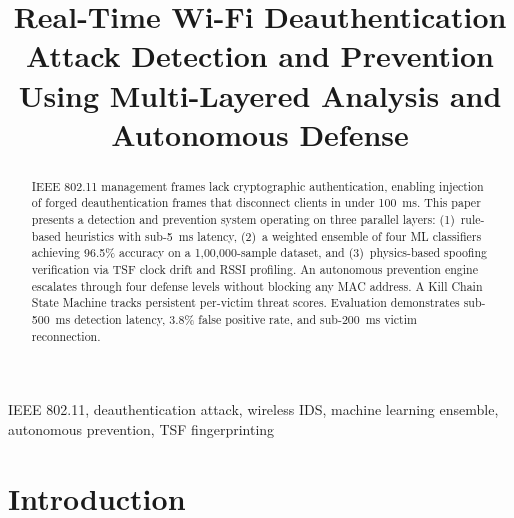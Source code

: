 \documentclass[conference]{IEEEtran}
\begin{document}
\title{Real-Time Wi-Fi Deauthentication Attack Detection and Prevention Using Multi-Layered Analysis and Autonomous Defense}

\author{
    \and
}

\maketitle

\begin{abstract}
IEEE 802.11 management frames lack cryptographic authentication, enabling injection of forged deauthentication frames that disconnect clients in under 100~ms. This paper presents a detection and prevention system operating on three parallel layers: (1)~rule-based heuristics with sub-5~ms latency, (2)~a weighted ensemble of four ML classifiers achieving 96.5\% accuracy on a 1,00,000-sample dataset, and (3)~physics-based spoofing verification via TSF clock drift and RSSI profiling. An autonomous prevention engine escalates through four defense levels without blocking any MAC address. A Kill Chain State Machine tracks persistent per-victim threat scores. Evaluation demonstrates sub-500~ms detection latency, 3.8\% false positive rate, and sub-200~ms victim reconnection.
\end{abstract}

\begin{IEEEkeywords}
IEEE 802.11, deauthentication attack, wireless IDS, machine learning ensemble, autonomous prevention, TSF fingerprinting
\end{IEEEkeywords}

\section{Introduction}
\end{document}
